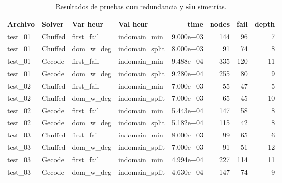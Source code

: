 \begin{compactfloats}
\begin{table}[H]
  \centering
  \small
  \setlength{\tabcolsep}{10.8pt}
  \caption{Resultados de pruebas \textbf{con} redundancia y \textbf{sin} simetrías.}
  \label{tab:pruebas-rectangulo-red-nosym}
  \begin{tabular}{l l l l r r r r}
    \toprule
    \textbf{Archivo} & \textbf{Solver} & \textbf{Var heur} & \textbf{Val heur} & \textbf{time} & \textbf{nodes} & \textbf{fail} & \textbf{depth} \\
    \midrule
    test\_01 & Chuffed & first\_fail  & indomain\_min   & 9.000e$-$03 & 144 & 96 & 7 \\
    test\_01 & Chuffed & dom\_w\_deg  & indomain\_split & 8.000e$-$03 & 91  & 74 & 8 \\
    test\_01 & Gecode  & first\_fail  & indomain\_min   & 9.488e$-$04 & 335 & 120 & 11 \\
    test\_01 & Gecode  & dom\_w\_deg  & indomain\_split & 9.280e$-$04 & 255 & 80  & 9 \\
    \midrule
    test\_02 & Chuffed & first\_fail  & indomain\_min   & 7.000e$-$03 & 55  & 47 & 5 \\
    test\_02 & Chuffed & dom\_w\_deg  & indomain\_split & 7.000e$-$03 & 65  & 45 & 10 \\
    test\_02 & Gecode  & first\_fail  & indomain\_min   & 5.443e$-$04 & 147 & 58 & 8 \\
    test\_02 & Gecode  & dom\_w\_deg  & indomain\_split & 5.182e$-$04 & 115 & 42 & 8 \\
    \midrule
    test\_03 & Chuffed & first\_fail  & indomain\_min   & 8.000e$-$03 & 99  & 65 & 6 \\
    test\_03 & Chuffed & dom\_w\_deg  & indomain\_split & 7.000e$-$03 & 91  & 51 & 12 \\
    test\_03 & Gecode  & first\_fail  & indomain\_min   & 4.994e$-$04 & 227 & 114 & 11 \\
    test\_03 & Gecode  & dom\_w\_deg  & indomain\_split & 4.630e$-$04 & 147 & 74 & 9 \\
    \bottomrule
  \end{tabular}
\end{table}


\end{compactfloats}
